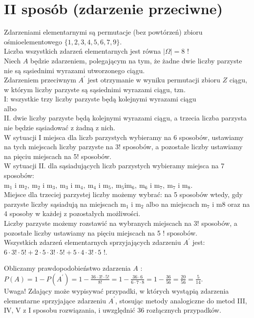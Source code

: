 \documentclass[10pt]{article}
\begin{document}
\section*{II sposób (zdarzenie przeciwne)}
Zdarzeniami elementarnymi są permutacje (bez powtórzeń) zbioru ośmioelementowego $\{1,2,3,4,5,6,7,9\}$.\\
Liczba wszystkich zdarzeń elementarnych jest równa $|\Omega|=8$ !\\
Niech $A$ będzie zdarzeniem, polegającym na tym, że żadne dwie liczby parzyste nie są sąsiednimi wyrazami utworzonego ciągu.\\
Zdarzeniem przeciwnym $A^{\prime}$ jest otrzymanie w wyniku permutacji zbioru $Z$ ciągu, w którym liczby parzyste są sąsiednimi wyrazami ciągu, tzn.\\
I: wszystkie trzy liczby parzyste będą kolejnymi wyrazami ciągu\\
albo\\
II. dwie liczby parzyste będą kolejnymi wyrazami ciągu, a trzecia liczba parzysta nie będzie sąsiadować z żadną z nich.\\
W sytuacji I miejsca dla liczb parzystych wybieramy na 6 sposobów, ustawiamy na tych miejscach liczby parzyste na 3! sposobów, a pozostałe liczby ustawiamy na pięciu miejscach na 5! sposobów.\\
W sytuacji II. dla sąsiadujących liczb parzystych wybieramy miejsca na 7 sposobów:\\
$\mathrm{m}_{1}$ i $\mathrm{m}_{2}, \mathrm{~m}_{2}$ i $\mathrm{m}_{3}, \mathrm{~m}_{3}$ i $\mathrm{m}_{4}, \mathrm{~m}_{4}$ i $\mathrm{m}_{5}, \mathrm{~m}_{5} \mathrm{i} \mathrm{m}_{6}, \mathrm{~m}_{6}$ i $\mathrm{m}_{7}, \mathrm{~m}_{7}$ i $\mathrm{m}_{8}$.\\
Miejsce dla trzeciej parzystej liczby możemy wybrać: na 5 sposobów wtedy, gdy parzyste liczby sąsiadują na miejscach $\mathrm{m}_{1}$ i $\mathrm{m}_{2}$ albo na miejscach $\mathrm{m}_{7}$ i m8 oraz na 4 sposoby w każdej z pozostałych możliwości.\\
Liczby parzyste możemy rozstawić na wybranych miejscach na 3! sposobów, a pozostałe liczby ustawiamy na pięciu miejscach na 5 ! sposobów.\\
Wszystkich zdarzeń elementarnych sprzyjających zdarzeniu $A^{\prime}$ jest:\\
$6 \cdot 3!\cdot 5!+2 \cdot 5 \cdot 3!\cdot 5!+5 \cdot 4 \cdot 3!\cdot 5$ !.

Obliczamy prawdopodobieństwo zdarzenia $A$ :\\
$P(A)=1-P\left(A^{\prime}\right)=1-\frac{36 \cdot 3!\cdot 5!}{8!}=1-\frac{36 \cdot 6}{6 \cdot 7 \cdot 8}=1-\frac{36}{56}=\frac{20}{56}=\frac{5}{14}$.\\
Uwaga! Zdający może wypisywać przypadki, w których wystąpią zdarzenia elementarne sprzyjające zdarzeniu $A^{\prime}$, stosując metody analogiczne do metod III, IV, V z I sposobu rozwiązania, i uwzględnić 36 rozłącznych przypadków.
\end{document}
